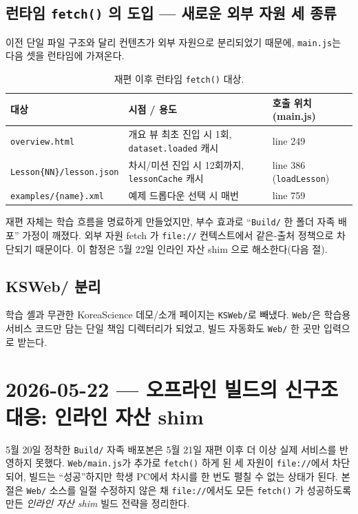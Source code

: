 \documentclass[11pt, oneside]{article}
\begin{document}
\subsection{런타임 \texttt{fetch()} 의 도입 --- 새로운 외부 자원 세 종류}

이전 단일 파일 구조와 달리 컨텐츠가 외부 자원으로 분리되었기 때문에,
\texttt{main.js}는 다음 셋을 런타임에 가져온다.

\begin{table}[h]
\centering
\small
\begin{tabularx}{\linewidth}{@{}lXl@{}}
\toprule
대상 & 시점 / 용도 & 호출 위치 (main.js) \\
\midrule
\texttt{overview.html}              & 개요 뷰 최초 진입 시 1회, \texttt{dataset.loaded} 캐시 & line 249 \\
\texttt{Lesson\{NN\}/lesson.json}   & 차시/미션 진입 시 12회까지, \texttt{lessonCache} 캐시 & line 386 (\texttt{loadLesson}) \\
\texttt{examples/\{name\}.xml}      & 예제 드롭다운 선택 시 매번 & line 759 \\
\bottomrule
\end{tabularx}
\caption{재편 이후 런타임 \texttt{fetch()} 대상.}
\end{table}

\begin{keypoint}
재편 자체는 학습 흐름을 명료하게 만들었지만, 부수 효과로 ``\texttt{Build/}
한 폴더 자족 배포'' 가정이 깨졌다. 외부 자원 fetch 가 \texttt{file://}
컨텍스트에서 같은-출처 정책으로 차단되기 때문이다. 이 함정은 5월 22일
인라인 자산 shim 으로 해소한다(다음 절).
\end{keypoint}

\subsection{KSWeb/ 분리}

학습 셸과 무관한 KoreaScience 데모/소개 페이지는 \texttt{KSWeb/}로
빼냈다. \texttt{Web/}은 학습용 서비스 코드만 담는 단일 책임 디렉터리가
되었고, 빌드 자동화도 \texttt{Web/} 한 곳만 입력으로 받는다.

\section{2026-05-22 --- 오프라인 빌드의 신구조 대응: 인라인 자산 shim}

5월 20일 정착한 \texttt{Build/} 자족 배포본은 5월 21일 재편 이후 더
이상 실제 서비스를 반영하지 못했다. \texttt{Web/main.js}가 추가로
\texttt{fetch()} 하게 된 세 자원이 \texttt{file://}에서 차단되어, 빌드는
``성공''하지만 학생 PC에서 차시를 한 번도 펼칠 수 없는 상태가 된다. 본
절은 \texttt{Web/} 소스를 일절 수정하지 않은 채 \texttt{file://}에서도
모든 \texttt{fetch()} 가 성공하도록 만든 \emph{인라인 자산 shim} 빌드
전략을 정리한다.
\end{document}
